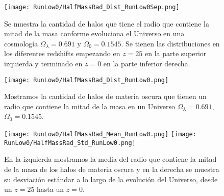 \begin{figure}[H]
    \centering
    \texttt{[image: RunLow0/HalfMassRad\_Dist\_RunLow0Sep.png]}
    \caption[Radio que contiene la mitad de la masa en la evolución de un Universo $\Omega_\lambda = 0.691$, $\Omega_0 = 0.1545$]{\footnotesize Se muestra la cantidad de halos que tiene el radio que contiene la mitad de la masa conforme evoluciona el Universo en una cosmología $\Omega_\lambda = 0.691$ y $\Omega_0 = 0.1545$. Se tienen las distribuciones en los diferentes redshifts empezando en $z=25$ en la parte superior izquierda y terminado en $z=0$ en la parte inferior derecha.}
    \label{fig:Low0-HalfMassRadDistSep}
\end{figure}

\begin{figure}[H]
    \centering
    \texttt{[image: RunLow0/HalfMassRad\_Dist\_RunLow0.png]}
    \caption[Distribución del radio que contiene la mitad de la masa en un Universo $\Omega_\lambda = 0.691$, $\Omega_0 = 0.1545$]{\footnotesize Mostramos la cantidad de halos de materia oscura que tienen un radio que contiene la mitad de la masa en un Universo $\Omega_\lambda = 0.691$, $\Omega_0 = 0.1545$.}
    \label{fig:Low0-HalfMassRadDist}
\end{figure}

\begin{figure}[H]
    \centering
    \texttt{[image: RunLow0/HalfMassRad\_Mean\_RunLow0.png]}
    \texttt{[image: RunLow0/HalfMassRad\_Std\_RunLow0.png]}
    \caption[Media y desviación estándar del radio de la mitad de la masa de un Universo $\Omega_\lambda = 0.691$, $\Omega_0 = 0.1545$]{\footnotesize En la izquierda mostramos la media del radio que contiene la mitad de la masa de los halos de materia oscura y en la derecha se muestra su desviación estándar a lo largo de la evolución del Universo, desde un $z=25$ hasta un $z=0$.}
    \label{fig:Low0-HalfMassRadStats}
\end{figure}